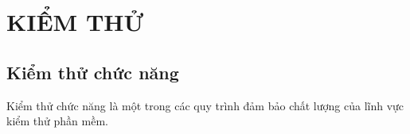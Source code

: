 \section{KIỂM THỬ}

\subsection{Kiểm thử chức năng}
Kiểm thử chức năng là một trong các quy trình đảm bảo chất lượng của lĩnh vực kiểm thử phần mềm.





